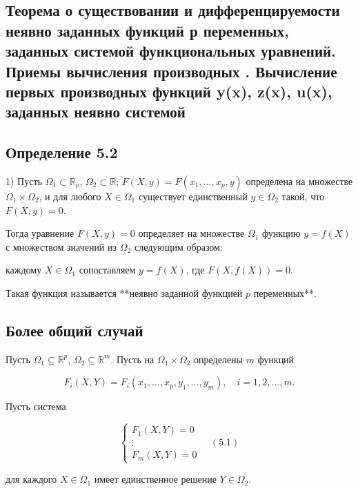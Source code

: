 {
\subsection{Теорема о существовании и дифференцируемости неявно заданных функций  р  переменных, заданных системой функциональных уравнений. Приемы вычисления производных .  
Вычисление первых производных функций y(x), z(x), u(x), заданных неявно системой}

\subsection*{Определение 5.2}

1) Пусть \( \Omega_1 \subset \mathbb{R}_p \), \( \Omega_2 \subset \mathbb{R} \); \( F(X,y) = F(x_1,...,x_p,y) \) определена на множестве \( \Omega_1 \times \Omega_2 \), и для любого \( X \in \Omega_1 \) существует единственный \( y \in \Omega_2 \) такой, что \( F(X,y) = 0 \).

Тогда уравнение \( F(X,y)=0 \) определяет на множестве \( \Omega_1 \) функцию \( y = f(X) \) с множеством значений из \( \Omega_2 \) следующим образом:

каждому \( X \in \Omega_1 \) сопоставляем \( y = f(X) \), где \( F(X, f(X)) = 0 \).

Такая функция называется **неявно заданной функцией \( p \) переменных**.

\subsection*{Более общий случай}

Пусть \( \Omega_1 \subseteq \mathbb{R}^p \), \( \Omega_2 \subseteq \mathbb{R}^m \). Пусть на \( \Omega_1 \times \Omega_2 \) определены \( m \) функций  



\[
F_i(X,Y) = F_i(x_1, \dots, x_p, y_1, \dots, y_m), \quad i = 1,2, \dots, m.
\]



Пусть система  



\[
\begin{cases}
F_1(X, Y) = 0 \\
\vdots \\
F_m(X, Y) = 0
\end{cases}
\quad (5.1)
\]



для каждого \( X \in \Omega_1 \) имеет единственное решение \( Y \in \Omega_2 \).  

}
